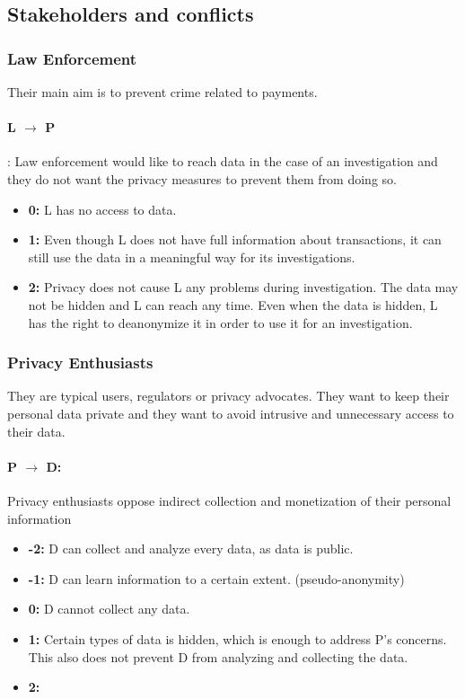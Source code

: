 \documentclass[runningheads]{llncs}
\begin{document}
 \subsection{Stakeholders and conflicts}
 \subsubsection{Law Enforcement}
  Their main aim is to prevent crime related to payments. 
  \paragraph{L $\rightarrow$ P}: Law enforcement would like to reach data in the case of an investigation and they do not want the privacy measures to prevent them from doing so.
  
  \begin{itemize}
  	\item \textbf{0:} L has no access to data. 
  	\item \textbf{1:} Even though L does not have full information about transactions, it can still use the data in a meaningful way for its investigations.
  	\item \textbf{2:} Privacy does not cause L any problems during investigation. The data may not be hidden and L can reach any time. Even when the data is hidden, L has the right to deanonymize it in order to use it for an investigation.
  \end{itemize}
  
  
 \subsubsection{Privacy Enthusiasts}
 They are typical users, regulators or privacy advocates. They want to keep their personal data private and they want to avoid intrusive and unnecessary access to their data.
 \paragraph{P $\rightarrow$ D:} Privacy enthusiasts oppose indirect collection and monetization of their personal information
 
   \begin{itemize}
 	\item \textbf{-2:} D can collect and analyze every data, as data is public. 
 	\item \textbf{-1:} D can learn information to a certain extent. (\eg pseudo-anonymity)
 	\item \textbf{0:} D cannot collect any data.
 	\item \textbf{1:} Certain types of data is hidden, which is enough to address P's concerns. This also does not prevent D from analyzing and collecting the data. 
 	\item \textbf{2:} 
 \end{itemize}
\end{document}
